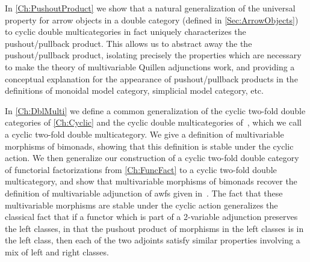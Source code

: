 In \cref{Ch:PushoutProduct} we show that a natural generalization of the universal property for arrow objects in a double category (defined in \cref{Sec:ArrowObjects}) to cyclic double multicategories in fact uniquely characterizes the pushout/pullback product. This allows us to abstract away the the pushout/pullback product, isolating precisely the properties which are necessary to make the theory of multivariable Quillen adjunctions work, and providing a conceptual explanation for the appearance of pushout/pullback products in the definitions of monoidal model category, simplicial model category, etc.

In \cref{Ch:DblMulti} we define a common generalization of the cyclic two-fold double categories of \cref{Ch:Cyclic} and the cyclic double multicategories of~\cite{cgr:mates}, which we call a cyclic two-fold double multicategory. We give a definition of multivariable morphisms of bimonads, showing that this definition is stable under the cyclic action. We then generalize our construction of a cyclic two-fold double category of functorial factorizations from \cref{Ch:FuncFact} to a cyclic two-fold double multicategory, and show that multivariable morphisms of bimonads recover the definition of multivariable adjunction of awfs given in~\cite{riehl:nwfs-monoidal}. The fact that these multivariable morphisms are stable under the cyclic action generalizes the classical fact that if a functor which is part of a 2-variable adjunction preserves the left classes, in that the pushout product of morphisms in the left classes is in the left class, then each of the two adjoints satisfy similar properties involving a mix of left and right classes.